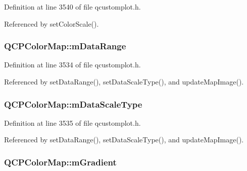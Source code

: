 Definition at line 3540 of file qcustomplot.\+h.



Referenced by set\+Color\+Scale().

\hypertarget{class_q_c_p_color_map_ab87609621d16cd3e9d52ad070b327b08}{}
\subsubsection[{m\+Data\+Range}]{ Q\+C\+P\+Color\+Map\+::m\+Data\+Range\hspace{0.3cm}{\ttfamily [protected]}}\label{class_q_c_p_color_map_ab87609621d16cd3e9d52ad070b327b08}


Definition at line 3534 of file qcustomplot.\+h.



Referenced by set\+Data\+Range(), set\+Data\+Scale\+Type(), and update\+Map\+Image().

\hypertarget{class_q_c_p_color_map_ab28a4b2def408f83b9818799d5f18446}{}
\subsubsection[{m\+Data\+Scale\+Type}]{ Q\+C\+P\+Color\+Map\+::m\+Data\+Scale\+Type\hspace{0.3cm}{\ttfamily [protected]}}\label{class_q_c_p_color_map_ab28a4b2def408f83b9818799d5f18446}


Definition at line 3535 of file qcustomplot.\+h.



Referenced by set\+Data\+Range(), set\+Data\+Scale\+Type(), and update\+Map\+Image().

\hypertarget{class_q_c_p_color_map_aab77fe9a8df6f0486ab3507cc5f278fa}{}
\subsubsection[{m\+Gradient}]{ Q\+C\+P\+Color\+Map\+::m\+Gradient\hspace{0.3cm}{\ttfamily [protected]}}\label{class_q_c_p_color_map_aab77fe9a8df6f0486ab3507cc5f278fa}


